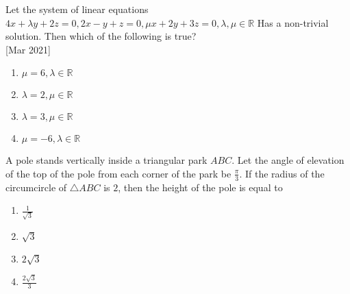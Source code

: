 \iffalse
\title{Assignment}
\author{ee24btech11059}
\section{mcq-single}
\fi
    \item{
          	Let the system of linear equations
          	$4x + \lambda y + 2z = 0,
          	2x - y + z = 0,
          	\mu x + 2y + 3z = 0, \lambda, \mu \in \mathbb{R}$
          	Has a non-trivial solution. Then which of the following is true?\\ \text{  }\hfill
                {[Mar 2021]}
                \begin{multicols}{2}
					\begin{enumerate}
						\item $\mu = 6, \lambda \in \mathbb{R}$
						\item $\lambda = 2, \mu \in \mathbb{R}$
						\item $\lambda = 3, \mu \in \mathbb{R}$
						\item $\mu = -6, \lambda \in \mathbb{R}$
					\end{enumerate}
				\end{multicols}
            }
    \item{
           	A pole stands vertically inside a triangular park $ABC$. Let the angle of elevation of the top of the pole from each corner of the park be $\frac{\pi}{3}$. If the radius of the circumcircle of $\triangle ABC$ is $2$, then the height of the pole is equal to
                \begin{multicols}{4}
                	\begin{enumerate}
                			\item $\frac{1}{\sqrt{3}}$
                			
                			\item $\sqrt{3}$
                			
                			\item $2\sqrt{3}$
                			
                			\item $\frac{2\sqrt{3}}{3}$
                	\end{enumerate}
                \end{multicols}
        }
